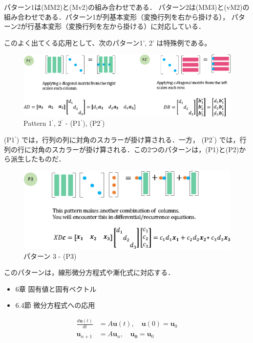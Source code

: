 \documentclass[letterpaper]{article}
\begin{document}
パターン1は(MM2)と(Mv2)の組み合わせである．
パターン2は(MM3)と(vM2)の組み合わせである．パターン1が列基本変形（変換行列を右から掛ける），
パターン2が行基本変形（変換行列を左から掛ける）に対応している．

このよく出てくる応用として、次のパターン1', 2' は特殊例である。

\begin{figure}[H]
  \includegraphics[keepaspectratio, width=\linewidth]{Pattern11-22.eps}
  \caption{Pattern 1$^\prime$, 2$^\prime$ - (P1$^\prime$), (P2$^\prime$)}
\end{figure}

(P1$^\prime$) では，行列の列に対角のスカラーが掛け算される．一方，
(P2$^\prime$) では，行列の行に対角のスカラーが掛け算される．この2つのパターンは，(P1)と(P2)から派生したものだ．

\begin{figure}[H]
  \includegraphics[keepaspectratio, width=\linewidth]{Pattern3.eps}
  \caption{パターン 3 - (P3)}
\end{figure}

このパターンは，線形微分方程式や漸化式に対応する．

\begin{itemize}
  \item 6章 固有値と固有ベクトル
  \item 6.4節 微分方程式への応用
\end{itemize} 

\begin{align*}
  \frac{d \bm{u}(t) }{dt} &= A \bm{u}(t), \quad \bm{u}(0) =\bm{u}_0\\
  \bm{u}_{n+1} &= A \bm{u}_n, \quad \bm{u_0} = \bm{u}_0
\end{align*}
\end{document}
